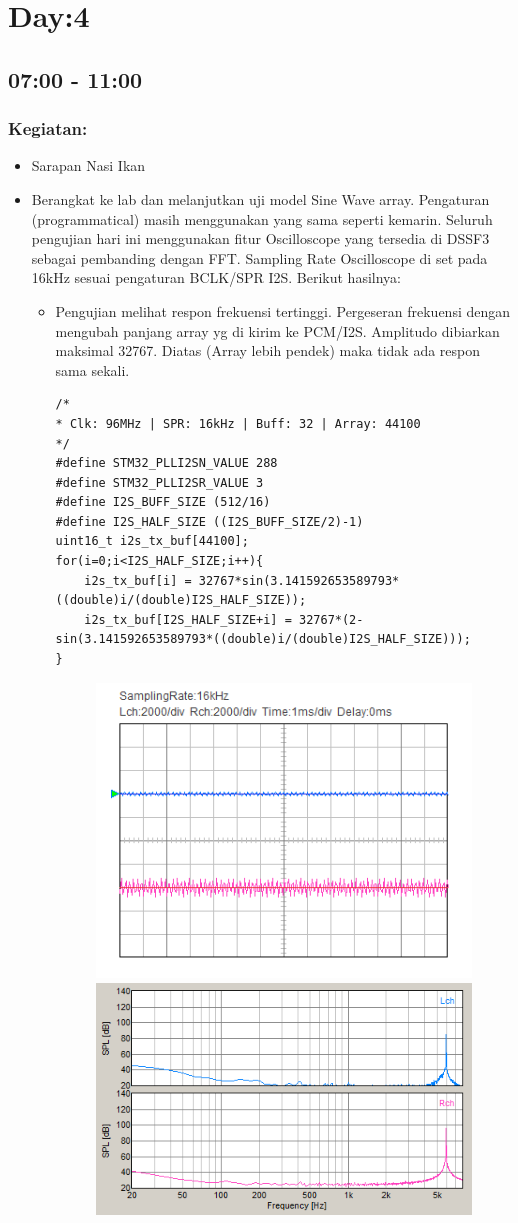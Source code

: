 \documentclass[12pt,]{article}
\begin{document}
	\newpage
	\section{Day:4}
	\subsection{07:00 - 11:00}
	\subsubsection{Kegiatan:}
	\begin{itemize}
		\item Sarapan Nasi Ikan
		\item Berangkat ke lab dan melanjutkan uji model Sine Wave array.
		Pengaturan (programmatical) masih menggunakan yang sama seperti kemarin.
		Seluruh pengujian hari ini menggunakan fitur Oscilloscope yang tersedia di DSSF3 
		sebagai pembanding dengan FFT.
		Sampling Rate Oscilloscope di set pada 16kHz sesuai pengaturan BCLK/SPR I2S.
		Berikut hasilnya:
		\begin{itemize}
			\item Pengujian melihat respon frekuensi tertinggi.
			Pergeseran frekuensi dengan mengubah panjang array yg di kirim ke PCM/I2S.
			Amplitudo dibiarkan maksimal 32767.
			Diatas (Array lebih pendek) maka tidak ada respon sama sekali.
			\begin{verbatim}
/*
* Clk: 96MHz | SPR: 16kHz | Buff: 32 | Array: 44100
*/
#define STM32_PLLI2SN_VALUE 288
#define STM32_PLLI2SR_VALUE 3
#define I2S_BUFF_SIZE (512/16)
#define I2S_HALF_SIZE ((I2S_BUFF_SIZE/2)-1)
uint16_t i2s_tx_buf[44100];
for(i=0;i<I2S_HALF_SIZE;i++){
	i2s_tx_buf[i] = 32767*sin(3.141592653589793*((double)i/(double)I2S_HALF_SIZE));
	i2s_tx_buf[I2S_HALF_SIZE+i] = 32767*(2-sin(3.141592653589793*((double)i/(double)I2S_HALF_SIZE)));
}
		\end{verbatim}
		\begin{figure}[H]
			\centering
			\includegraphics[width=0.45\linewidth]{result/day_3/osi_highest_fr}
			\includegraphics[width=0.45\linewidth]{result/day_3/fft_highest_fr}
		\end{figure}
		

\end{itemize}
\end{itemize}
\end{document}
